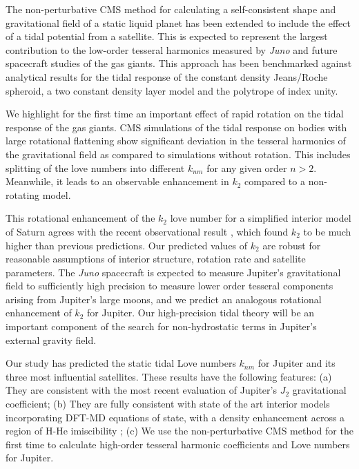 The non-perturbative CMS method for calculating a self-consistent shape and
gravitational field of a static liquid planet has been extended to include the
effect of a tidal potential from a satellite. This is expected to represent the
largest contribution to the low-order tesseral harmonics measured by
\textit{Juno} and future spacecraft studies of the gas giants. This approach
has been benchmarked against analytical results for the tidal response of the
constant density Jeans/Roche spheroid, a two constant density layer model and
the polytrope of index unity. 

We highlight for the first time an important effect of rapid rotation on the tidal
response of the gas giants. CMS simulations of the tidal response on bodies with
large rotational flattening show significant deviation in the tesseral harmonics of
the gravitational field as compared to simulations without rotation. This includes
splitting of the love numbers into different $k_{nm}$ for any given order $n>2$.
Meanwhile, it leads to an observable enhancement in $k_2$ compared to a non-rotating
model.

This rotational enhancement of the $k_2$ love number for a simplified interior model
of Saturn agrees with the recent observational result \citep{lainey2016}, which found
$k_2$ to be much higher than previous predictions. Our predicted values of $k_2$ are
robust for reasonable assumptions of interior structure, rotation rate and satellite
parameters.  The \textit{Juno} spacecraft is expected to measure Jupiter's
gravitational field to sufficiently high precision to measure lower order tesseral
components arising from Jupiter's large moons, and we predict an analogous rotational
enhancement of $k_2$ for Jupiter.  Our high-precision tidal theory will be an
important component of the search for non-hydrostatic terms in Jupiter's external
gravity field.

Our study has predicted the static tidal Love numbers $k_{nm}$ for Jupiter and its three
most influential satellites. These results have the following features: (a) They are
consistent with the most recent evaluation of Jupiter's $J_2$ gravitational
coefficient; (b) They are fully consistent with state of the art interior models
\citep{hubbard2016} incorporating DFT-MD equations of state, with a density
enhancement across a region of H-He imiscibility \citep{morales2013}; (c) We use the
non-perturbative CMS method for the first time to calculate high-order tesseral
harmonic coefficients and Love numbers for Jupiter.

